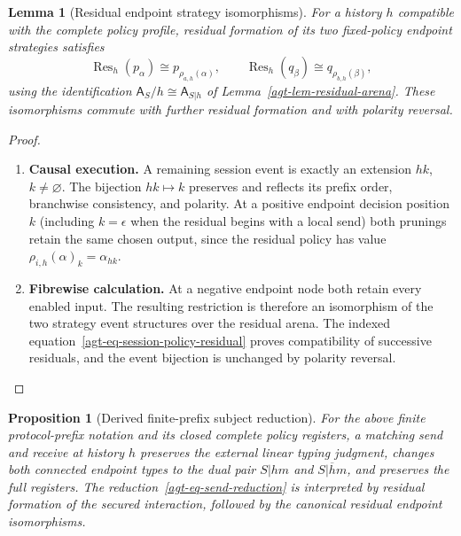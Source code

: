 \documentclass[11pt,a4paper]{article}
\numberwithin{equation}{section}
\newtheorem{proposition}[theorem]{Proposition}
\newtheorem{lemma}[theorem]{Lemma}
\theoremstyle{definition}
\theoremstyle{remark}
\theoremstyle{plain}
\begin{document}
\begin{lemma}[Residual endpoint strategy isomorphisms]
\label{agt-lem-residual-endpoints}
For a history $h$ compatible with the complete policy profile, residual
formation of its two fixed-policy endpoint strategies satisfies
\[
 \operatorname{Res}_h(p_\alpha)\cong p_{\rho_{a,h}(\alpha)},
 \qquad
 \operatorname{Res}_h(q_\beta)\cong q_{\rho_{b,h}(\beta)},
\]
using the identification
$\mathsf A_S/h\cong\mathsf A_{S|h}$ of
Lemma~\ref{agt-lem-residual-arena}. These isomorphisms commute with
further residual formation and with polarity reversal.
\end{lemma}
\begin{proof}
\leavevmode
\begin{enumerate}[label=\textup{(\arabic*)},leftmargin=*,itemsep=4pt,topsep=3pt]
  \item \textbf{Causal execution.} A remaining session event is exactly an extension $hk$, $k\ne\varnothing$. The bijection $hk\mapsto k$ preserves and reflects its prefix order,
branchwise consistency, and polarity. At a positive endpoint decision position $k$ (including $k=\epsilon$
when the residual begins with a local send) both prunings retain the
same chosen output, since the residual policy has value
$\rho_{i,h}(\alpha)_k=\alpha_{hk}$.
  \item \textbf{Fibrewise calculation.} At a negative endpoint node both
retain every enabled input. The resulting restriction is therefore an
isomorphism of the two strategy event structures over the residual arena. The indexed equation~\eqref{agt-eq-session-policy-residual} proves
compatibility of successive residuals, and the event bijection is
unchanged by polarity reversal.
\end{enumerate}
\end{proof}
\begin{proposition}[Derived finite-prefix subject reduction]
\label{agt-prop-session-subject-reduction}
For the above finite protocol-prefix notation and its closed complete
policy registers, a matching send and receive at history $h$ preserves
the external linear typing judgment, changes both connected endpoint
types to the dual pair $S|hm$ and $\overline{S|hm}$, and preserves the
full registers. The reduction~\eqref{agt-eq-send-reduction} is interpreted
by residual formation of the secured interaction, followed by the
canonical residual endpoint isomorphisms.
\end{proposition}
\end{document}
